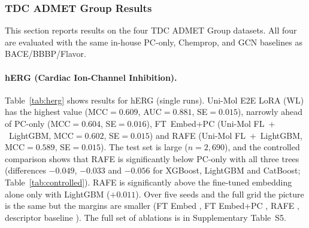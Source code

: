 \documentclass[pdflatex,sn-mathphys-num]{sn-jnl}%
\begin{document}
\begin{table}[ht]
\centering
\caption{Best configurations on BACE. $^*$ overall best by MCC.}
\label{tab:bace}
\end{table}

\subsubsection{TDC ADMET Group Results}\label{sec:new_datasets}
This section reports results on the four TDC ADMET Group datasets. All four are evaluated with the same in-house PC-only, Chemprop, and GCN baselines as BACE/BBBP/Flavor.

\paragraph{hERG (Cardiac Ion-Channel Inhibition).} Table~\ref{tab:herg} shows results for hERG (single runs). Uni-Mol E2E LoRA (WL) has the highest value (MCC$=0.609$, AUC$=0.881$, SE$=0.015$), narrowly ahead of PC-only (MCC$=0.604$, SE$=0.016$), FT~Embed+PC (Uni-Mol FL~$+$~LightGBM, MCC$=0.602$, SE$=0.015$) and RAFE (Uni-Mol FL~$+$~LightGBM, MCC$=0.589$, SE$=0.015$). The test set is large ($n=2{,}690$), and the controlled comparison shows that RAFE is significantly below PC-only with all three trees (differences $-0.049$, $-0.033$ and $-0.056$ for XGBoost, LightGBM and CatBoost; Table~\ref{tab:controlled}). RAFE is significantly above the fine-tuned embedding alone only with LightGBM ($+0.011$). Over five seeds and the full grid the picture is the same but the margins are smaller (FT Embed \mHERGFT{}, FT Embed+PC \mHERGFTPC{}, RAFE \mHERGRAFE{}, descriptor baseline \mHERGPC{}). The full set of ablations is in Supplementary Table~S5.
\end{document}
